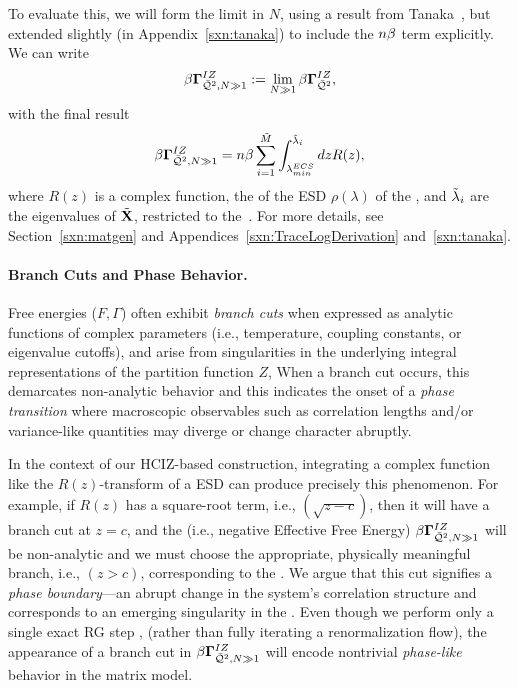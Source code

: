 To evaluate this, we will form the \LargeN limit in $N$, using a result from Tanaka~\cite{Tanaka2007,Tanaka2008},
but extended slightly (in Appendix~\ref{sxn:tanaka}) to include the  $n\beta$ term explicitly.
We can write
\begin{align}
  \label{eqn:izgin_def}
  \beta\mathbf{\Gamma}^{IZ}_{\bar{\mathcal{Q}}^{2},N\gg 1}:=\lim_{N\gg 1}\beta\mathbf{\Gamma}^{IZ}_{\bar{\mathcal{Q}}^{2}} ,
\end{align}
with the final result
  \begin{align}
    \label{eqn:hciz_tanaka}
    \beta\mathbf{\Gamma}^{IZ}_{\bar{\mathcal{Q}}^{2},N\gg 1}=n\beta\sum_{i=1}^{\tilde{M}}\int^{\tilde{\lambda}_{i}}_{\lambda^{ECS}_{min}} dz R(z) ,
\end{align}
where $R(z)$ is a complex function, the \RTransform of the ESD $\rho(\lambda)$ of the \Teacher, and $\tilde{\lambda}_{i}$ are the eigenvalues of \Teacher \CorrelationMatrix $\tilde{\mathbf{X}}$, restricted to the~\ECS.
For more details, see Section~\ref{sxn:matgen} and Appendices~\ref{sxn:TraceLogDerivation} and~\ref{sxn:tanaka}.

\paragraph{Branch Cuts and Phase Behavior.}
Free energies ($F,\Gamma$)  often exhibit \emph{branch cuts} when expressed as analytic functions 
of complex parameters (i.e., temperature, coupling constants, or eigenvalue cutoffs),
and arise from singularities in the underlying integral representations of the partition function $Z$,
When a branch cut occurs, this demarcates non-analytic behavior
and this indicates the onset of a \emph{phase transition} where
macroscopic observables such as correlation lengths and/or variance-like quantities
may diverge or change character abruptly.  

In the context of our HCIZ-based construction, integrating a complex function like the $R(z)$-transform of
a \HeavyTailed ESD can produce precisely this phenomenon.
For example, if $R(z)$ has a square-root term, i.e., $(\sqrt{z-c})$, then it will have a branch cut at $z=c$,
and the \GeneratingFunction (i.e.,  negative Effective Free Energy) $\beta\mathbf{\Gamma}^{IZ}_{\bar{\mathcal{Q}}^{2},N\gg 1}$
will be non-analytic and we must choose the appropriate, physically meaningful branch, i.e., $(z>c)$,
corresponding to the \ECS.
We argue that this cut signifies a \emph{phase boundary}—an abrupt change
in the system’s correlation structure and corresponds to an emerging singularity in the \LayerQuality.
Even though we perform only a single exact RG step , 
(rather than fully iterating a renormalization flow), the appearance of a branch cut in $\beta\mathbf{\Gamma}^{IZ}_{\bar{\mathcal{Q}}^{2},N\gg 1}$ will encode
nontrivial \emph{phase-like} behavior in the \SETOL \HeavyTailed matrix model.



